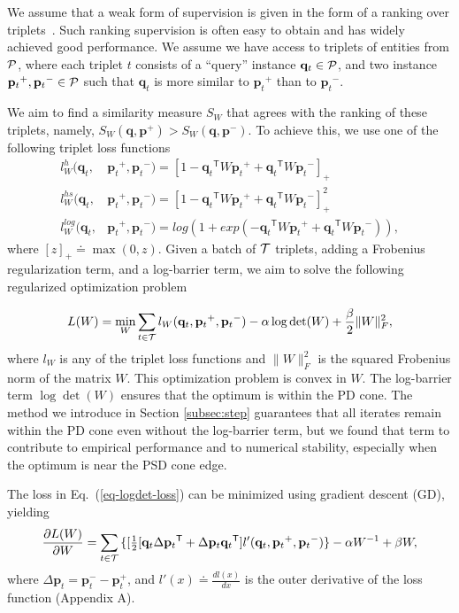 \documentclass[twoside,11pt]{article}
\newcommand\mat[1]{{#1}}
\renewcommand\vec[1]{\mathbf{#1}}
\newcommand{\T}{{}^\mathsf{T}}
\newcommand{\W}{\mat{W}}
\newcommand{\eqdef}{\doteq}
\newcommand{\frobsq}[1]{{\|#1\|_F^2}}
\newcommand{\q}{{\vec{q}}}
\newcommand{\p}{{\vec{p}}}
\newcommand{\trip}{{t}}
\newcommand{\qt}{{\q_{\trip}}}
\newcommand{\pt}{{\p_{\trip}}}
\newcommand{\triplet}{(\qt, \pt^{+}, \pt^{-})}
\renewcommand{\eqref}[1]{Eq.~(\ref{#1})}
\begin{document}
We assume that a weak form of supervision is given in the form of a ranking over triplets~\citep{weinberger2006dml,OASIS,qian}. Such ranking supervision is often easy to obtain and has widely achieved good performance. We assume we have access to triplets of entities from $\cal{P}$, where each triplet $t$ consists of
a ``query'' instance $\qt \in \cal{P}$, and two instance $\pt^{+}, \pt^{-} \in \cal{P}$ such that $\qt$ is more similar to $\pt^{+}$
than to $\pt^{-}$.

We aim to find a similarity measure $S_{\W}$ that agrees with the ranking of these triplets, namely, $S_{\W}(\q, \p^{+}) > S_{\W}(\q,
\p^{-})$. To achieve this, we use one of the following triplet loss functions
\begin{align}
\label{single-triplet-lossed}
l_{\W}^h(\qt, &\pt^{+}, \pt^{-}) = [1-\qt\T\W\pt^+ + \qt\T\W\pt^-]_{+}
 \\ \nonumber
l_{\W}^{hs}(\qt, &\pt^+, \pt^-) = [1-\qt\T\W\pt^+ + \qt\T\W\pt^-]_{+}^2
 \\ \nonumber
l_{\W}^{log}(\qt, &\pt^+, \pt^-) = log(1+exp(-\qt\T\W\pt^+ + \qt\T\W\pt^-)) \nonumber ,
\end{align}
where $[z]_{+} \eqdef \max(0,z)$. Given a batch of $\cal{T}$ triplets, adding a Frobenius regularization term, and a log-barrier term, we aim to solve the following regularized optimization problem

\begin{equation}
\label{eq-logdet-loss}
L(W) = 
  \min_{\W} \sum_{\trip \in \cal{T}}  l_{\W}(\qt, \pt^+, \pt^-) - \alpha \log \det(\W) + \frac{\beta}{2} \frobsq{\W},
\end{equation}
where $l_{\W}$ is any of the triplet loss functions and $\frobsq{\W}$ is the squared Frobenius norm of the matrix $\W$. This optimization problem is convex in $\W$.
The log-barrier term $\log \det(\W)$ ensures that the optimum is within the PD cone. The method we introduce in Section \ref{subsec:step} guarantees that all iterates remain within the PD cone even without the log-barrier term, but we found that term to contribute to empirical performance and to numerical stability, especially when the optimum is near the PSD cone edge.


The loss in \eqref{eq-logdet-loss} can be minimized using gradient descent (GD), yielding
\begin{equation}
  \frac{\partial {L (\W)}}{\partial \W} = \sum\limits_{t\in \cal{T}}{\{
  [\tfrac{1}{2}[\q_{t}\Delta\p_{t}\T + \Delta\p_{t}\q_{t}\T]  }
  {l'}\triplet\} - \alpha \W^{-1} + \beta \W,
  \label{gradMtx}
\end{equation}
where $\Delta\p_t = \p_t^- - \p_t^+$, and $l'(x) \eqdef \frac{d{l(x)}}{dx}$ is the outer derivative of the loss function (Appendix A).%
\vspace{-6pt}
\end{document}
